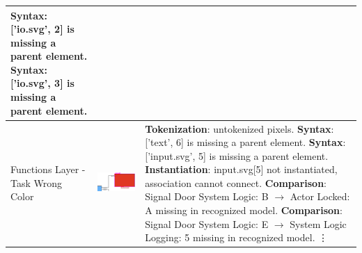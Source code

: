 \begin{longtable}{p{} >{\raggedright\arraybackslash}m{} >{\raggedright\arraybackslash}m{}}
        \textbf{Syntax}: ['io.svg', 2] is missing a parent element. \newline
        \textbf{Syntax}: ['io.svg', 3] is missing a parent element. \\
    \midrule
    Functions Layer - Task Wrong Color &  \includegraphics[width=\linewidth]{pictures/31_wrong_color_task_output_clip.png} & \textbf{Tokenization}: untokenized pixels. \newline
        \textbf{Syntax}: ['text', 6] is missing a parent element. \newline
        \textbf{Syntax}: ['input.svg', 5] is missing a parent element. \newline
        \textbf{Instantiation}: input.svg[5] not instantiated, association cannot connect. \newline
        \textbf{Comparison}: Signal Door System Logic: B $\rightarrow$ Actor Locked: A missing in recognized model. \newline
        \textbf{Comparison}: Signal Door System Logic: E $\rightarrow$ System Logic Logging: 5 missing in recognized model. \newline
        \vdots \\
    \midrule

\end{longtable}

